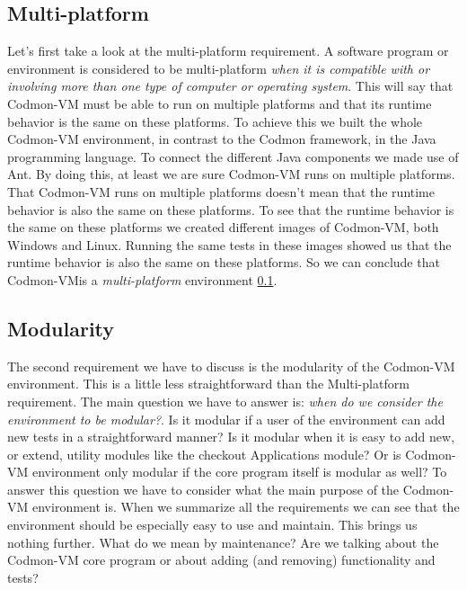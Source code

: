 \documentclass{article}
\newcommand{\project}{Codmon-VM}
\begin{document}
\subsection{Multi-platform}
\label{dis:multi}
Let's first take a look at the multi-platform requirement. A software program or environment is considered to be multi-platform \emph{when it is compatible with or involving more than one type of computer or 
operating system}\cite{def:multi}. This will say that \project{} must be able to run on multiple platforms and that its runtime behavior is the same on these platforms. To achieve this we built the whole 
\project{} environment, in contrast to the Codmon framework, in the Java programming language. To connect the different Java components we made use of Ant. By doing this, at least we are sure \project{} 
runs on multiple platforms\cite{Java}.\\

\noindent That \project{} runs on multiple platforms doesn't mean that the runtime behavior is also the same on these platforms. To see that the runtime behavior is the same on these platforms we created 
different images of \project{}, both Windows and Linux. Running the same tests in these images showed us that the runtime behavior is also the same on these platforms. So we can conclude that \project is 
a \emph{multi-platform} environment \ref{dis:multi}.\\


\subsection{Modularity}
\label{dis:modular}
The second requirement we have to discuss is the modularity of the \project{} environment. This is a little less straightforward than the Multi-platform requirement. The main question we have to answer is: 
\emph{when do we consider the environment to be modular?}. Is it modular if a user of the environment can add new tests in a straightforward manner? Is it modular when it is easy to add new, or extend, utility 
modules like the checkout Applications module? Or is \project{} environment only modular if the core program itself is modular as well? To answer this question we have to consider what the main purpose of the 
\project{} environment is. When we summarize all the requirements we can see that the environment should be especially easy to use and maintain. This brings us nothing further. What do we mean by 
maintenance? Are we talking about the \project{} core program or about adding (and removing) functionality and tests?
\end{document}
